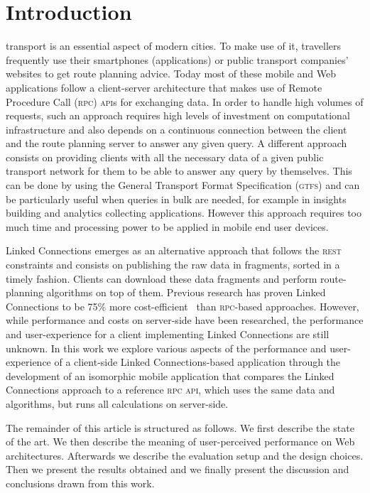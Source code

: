 \documentclass[twocolumn]{phdsymp} %
\begin{document}
\section{Introduction}
 transport is an essential aspect of modern cities. To make use of it, travellers frequently use their smartphones (applications) or public transport companies' websites to get route planning advice. Today most of these mobile and Web applications follow a client-server architecture that makes use of Remote Procedure Call (\textsc{rpc}) \textsc{api}s for exchanging data. In order to handle high volumes of requests, such an approach requires high levels of investment on computational infrastructure and also depends on a continuous connection between the client and the route planning server to answer any given query. A different approach consists on providing clients with all the necessary data of a given public transport network for them to be able to answer any query by themselves. This can be done by using the General Transport Format Specification (\textsc{gtfs}) and can be particularly useful when queries in bulk are needed, for example in insights building and analytics collecting applications. However this approach requires too much time and processing power to be applied in mobile end user devices.

Linked Connections emerges as an alternative approach that follows the \textsc{rest} constraints and consists on publishing the raw data in fragments, sorted in a timely fashion. Clients can download these data fragments and perform route-planning algorithms on top of them. Previous research has proven Linked Connections to be 75\% more cost-efficient~\cite{colpaert17} than \textsc{rpc}-based approaches. However, while performance and costs on server-side have been researched, the performance and user-experience for a client implementing Linked Connections are still unknown. In this work we explore various aspects of the performance and user-experience of a client-side Linked Connections-based application through the development of an isomorphic mobile application that compares the Linked Connections approach to a reference \textsc{rpc} \textsc{api}, which uses the same data and algorithms, but runs all calculations on server-side.

The remainder of this article is structured as follows. We first describe the state of the art. We then describe the meaning of user-perceived performance on Web architectures. Afterwards we describe the evaluation setup and the design choices. Then we present the results obtained and we finally present the discussion and conclusions drawn from this work.
\end{document}
